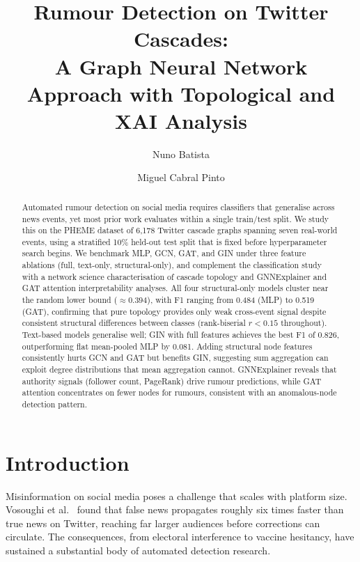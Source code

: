\documentclass[runningheads]{llncs}
\title{Rumour Detection on Twitter Cascades:\\ A Graph Neural Network Approach with Topological and XAI Analysis}
\author{Nuno Batista \and Miguel Cabral Pinto}
\institute{University of Coimbra, Coimbra, Portugal}
\begin{document}
\maketitle

\begin{abstract}
Automated rumour detection on social media requires classifiers that generalise
across news events, yet most prior work evaluates within a single train/test
split. We study this on the PHEME dataset of 6{,}178 Twitter cascade graphs
spanning seven real-world events, using a stratified 10\% held-out test split
that is fixed before hyperparameter search begins. We benchmark MLP, GCN, GAT,
and GIN under three feature ablations (full, text-only, structural-only), and
complement the classification study with a network science characterisation of
cascade topology and GNNExplainer and GAT attention interpretability analyses.
All four structural-only models cluster near the random lower bound ($\approx
0.394$), with F1 ranging from 0.484 (MLP) to 0.519 (GAT), confirming that
pure topology provides only weak cross-event signal despite consistent
structural differences between classes (rank-biserial $r < 0.15$ throughout). Text-based models generalise well; GIN with full features achieves
the best F1 of 0.826, outperforming flat mean-pooled MLP by 0.081.
Adding structural node features consistently hurts GCN and GAT but benefits GIN,
suggesting sum aggregation can exploit degree distributions that mean aggregation
cannot. GNNExplainer reveals that authority signals (follower count, PageRank)
drive rumour predictions, while GAT attention concentrates on fewer nodes for
rumours, consistent with an anomalous-node detection pattern.
\end{abstract}

\section{Introduction}

Misinformation on social media poses a challenge that scales with platform size.
Vosoughi et al.~\cite{vosoughi2018spread} found that false news propagates roughly
six times faster than true news on Twitter, reaching far larger audiences before
corrections can circulate. The consequences, from electoral interference to
vaccine hesitancy, have sustained a substantial body of automated detection
research.
\end{document}
